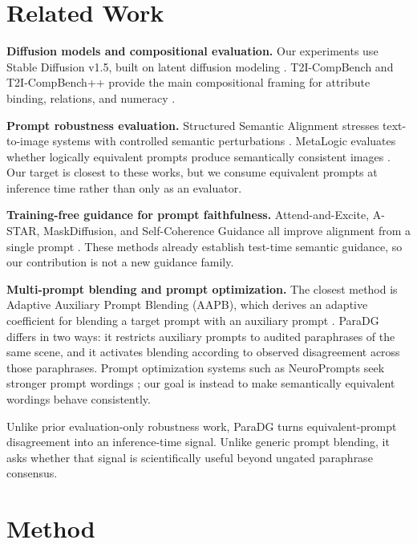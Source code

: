 \documentclass{article}
\newcommand{\method}{ParaDG}
\begin{document}
\section{Related Work}
\label{sec:related}
\textbf{Diffusion models and compositional evaluation.}
Our experiments use Stable Diffusion v1.5, built on latent diffusion modeling \citep{rombach2022latent}. T2I-CompBench and T2I-CompBench++ provide the main compositional framing for attribute binding, relations, and numeracy \citep{huang2023t2icompbench,huang2025t2icompbenchpp}.

\textbf{Prompt robustness evaluation.}
Structured Semantic Alignment stresses text-to-image systems with controlled semantic perturbations \citep{feng2023ssa}. MetaLogic evaluates whether logically equivalent prompts produce semantically consistent images \citep{shen2026metalogic}. Our target is closest to these works, but we consume equivalent prompts at inference time rather than only as an evaluator.

\textbf{Training-free guidance for prompt faithfulness.}
Attend-and-Excite, A-STAR, MaskDiffusion, and Self-Coherence Guidance all improve alignment from a single prompt \citep{chefer2023attend,agarwal2023astar,zhou2023maskdiffusion,wang2025scg}. These methods already establish test-time semantic guidance, so our contribution is not a new guidance family.

\textbf{Multi-prompt blending and prompt optimization.}
The closest method is Adaptive Auxiliary Prompt Blending (AAPB), which derives an adaptive coefficient for blending a target prompt with an auxiliary prompt \citep{lee2026aapb}. \method{} differs in two ways: it restricts auxiliary prompts to audited paraphrases of the same scene, and it activates blending according to observed disagreement across those paraphrases. Prompt optimization systems such as NeuroPrompts seek stronger prompt wordings \citep{rosenman2024neuroprompts}; our goal is instead to make semantically equivalent wordings behave consistently.

Unlike prior evaluation-only robustness work, \method{} turns equivalent-prompt disagreement into an inference-time signal. Unlike generic prompt blending, it asks whether that signal is scientifically useful beyond ungated paraphrase consensus.

\section{Method}
\label{sec:method}
\end{document}
